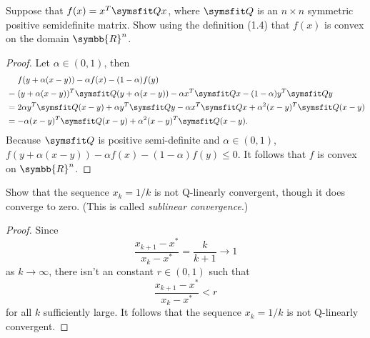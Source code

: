 \documentclass[lineno]{assignment}
\newcommand{\BR}{\symbb{R}}
\theoremstyle{plain}
\begin{document}
    \begin{problem}
        Suppose that $f(x)=x^T\matr{Q}x$, where $\matr{Q}$ is an $n\times n$ symmetric positive semidefinite matrix. Show using the definition (1.4) that $f(x)$ is convex on the domain $\BR^n$.
    \end{problem}
    \begin{proof}
        Let $\alpha \in (0, 1)$, then
        \begin{equation}
            \begin{aligned}
                &\phantom{{}={}} f(y+\alpha(x-y))-\alpha f(x)-(1-\alpha)f(y)\\
                &= (y+\alpha(x-y))^T\matr{Q}(y+\alpha(x-y))-\alpha x^T\matr{Q}x-(1-\alpha)y^T\matr{Q}y\\
                &= 2\alpha y^T\matr{Q}(x-y)+\alpha y^T\matr{Q}y-\alpha x^T\matr{Q}x+\alpha^2(x-y)^T\matr{Q}(x-y)\\
                &= -\alpha(x-y)^T\matr{Q}(x-y)+\alpha^2(x-y)^T\matr{Q}(x-y).
            \end{aligned}
        \end{equation}
        Because $\matr{Q}$ is positive semi-definite and $\alpha \in (0, 1)$, $f(y+\alpha(x-y))-\alpha f(x)-(1-\alpha)f(y) \leq 0$. It follows that $f$ is convex on $\BR^n$.
    \end{proof}
    \begin{problem}
        Show that the sequence $x_k=1/k$ is not Q-linearly convergent, though it does converge to zero. (This is called \textit{sublinear convergence}.)
    \end{problem}
    \begin{proof}
        Since
        \begin{equation}
            \frac{x_{k+1}-x^{*}}{x_k-x^{*}} = \frac{k}{k+1} \to 1
        \end{equation}
        as $k \to \infty$, there isn't an constant $r\in(0, 1)$ such that
        \begin{equation}
            \frac{x_{k+1}-x^{*}}{x_k-x^{*}} < r
        \end{equation}
        for all $k$ sufficiently large. It follows that the sequence $x_k=1/k$ is not Q-linearly convergent.
    \end{proof}
\end{document}
